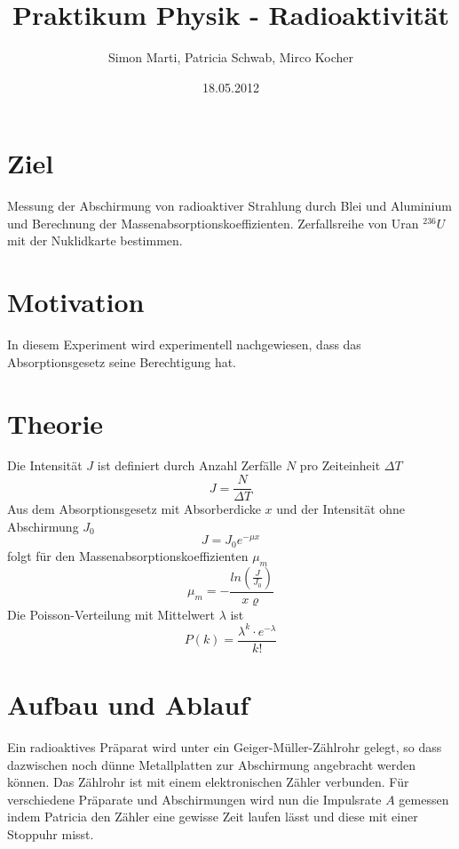 \documentclass[12pt,a4paper]{article}
\title{Praktikum Physik - Radioaktivität}
\author{Simon Marti, Patricia Schwab, Mirco Kocher}
\date{18.05.2012}
\begin{document}
\maketitle

\section*{Ziel}
Messung der Abschirmung von radioaktiver Strahlung durch Blei und Aluminium und Berechnung der Massenabsorptionskoeffizienten. Zerfallsreihe von Uran $^{236}U$ mit der Nuklidkarte bestimmen.

\section*{Motivation}
In diesem Experiment wird experimentell nachgewiesen, dass das Absorptionsgesetz seine Berechtigung hat.

\section*{Theorie}
Die Intensit\"at $J$ ist definiert durch Anzahl Zerf\"alle $N$ pro Zeiteinheit $\Delta T$
\begin{equation}
J =\frac{N}{\Delta T}
\end{equation}
Aus dem Absorptionsgesetz mit Absorberdicke $x$ und der Intensit\"at ohne Abschirmung $J_0$
\begin{equation}
J = J_0 e^{-\mu x}
\end{equation}
folgt f\"ur den Massenabsorptionskoeffizienten $\mu_m$
\begin{equation}
\mu_m = - \frac{ln(\frac{J}{J_0})}{x \varrho}
\end{equation}
Die Poisson-Verteilung mit Mittelwert $\lambda$ ist
\begin{equation}
P(k) = \frac{\lambda^k \cdot e^{-\lambda}}{k!}
\end{equation}


\section*{Aufbau und Ablauf}
Ein radioaktives Präparat wird unter ein Geiger-Müller-Zählrohr gelegt, so dass dazwischen noch dünne Metallplatten zur Abschirmung angebracht werden können. Das Zählrohr ist mit einem elektronischen Zähler verbunden. Für verschiedene Präparate und Abschirmungen wird nun die Impulsrate $A$ gemessen indem Patricia den Zähler eine gewisse Zeit laufen lässt und diese mit einer Stoppuhr misst.
\end{document}
